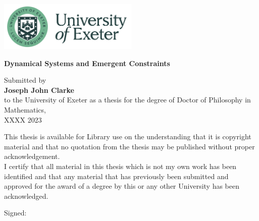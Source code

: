 \graphicspath{{figs/}}
\begin{titlepage}
        \begin{center}
        \vspace{1cm}
        \includegraphics[width=0.5\textwidth]{Exeter_logo.png}
        \Huge
        
        \vspace*{1.5cm}
        \textbf{Dynamical Systems and Emergent Constraints}
        \vspace{2cm}
        \large


        Submitted by\\
        \textbf{Joseph John Clarke}\\
        to the University of Exeter as a thesis for the degree of Doctor of Philosophy in Mathematics,\\
        XXXX 2023

        \vspace{2cm}
        \normalsize
        This thesis is available for Library use on the understanding that it is copyright
	material and that no quotation from the thesis may be published without proper
	acknowledgement.\\
	\vspace{1cm}
	I certify that all material in this thesis which is not my own work has been identified
	and that any material that has previously been submitted and approved for the award
	of a degree by this or any other University has been acknowledged.
	
	
	\vspace{1cm}
	Signed: \dotfill
        \end{center}
\end{titlepage}